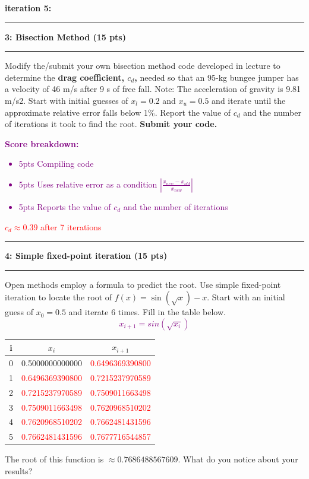 \documentclass[11pt]{article}
\newcommand\question[2]{\vspace{.25in}\hrule\textbf{#1: #2}\vspace{.5em}\hrule\vspace{.10in}}
\begin{document}
\textbf{iteration 5:}\\

\question{3}{Bisection Method (15 pts)}
Modify the/submit your own bisection method code developed in lecture to determine the \textbf{drag coefficient, $c_d$,} needed so that an 95-kg bungee jumper has a velocity of 46 m/s after
9 s of free fall. Note: The acceleration of gravity is 9.81 m/s2.
Start with initial guesses of $x_l = 0.2$ and $x_u = 0.5$ and iterate
until the approximate relative error falls below 1\%. Report the value of $c_d$ and the number of iterations it took to find the root. \textbf{Submit your code.}
\\
\vspace{4pt}
\textcolor{purple}{\textbf{Score breakdown:}
	\begin{itemize}
		\item 5pts Compiling code
		\item 5pts Uses relative error as a condition $|\frac{x_{new}-x_{old}}{x_{new}}|$
		\item 5pts Reports the value of $c_d$ and the number of iterations
\end{itemize}}
\textcolor{red}{$c_d \approx 0.39$ after 7 iterations}

\newpage
\question{4}{Simple fixed-point iteration (15 pts)}
Open methods employ a formula to predict the root. Use simple fixed-point iteration to locate the root of $f(x)=\sin(\sqrt{x})-x$. Start with an initial guess of $x_0=0.5$ and iterate 6 times. Fill in the table below. \\
\textcolor{purple}{$$x_{i+1}=sin(\sqrt{x_i})$$}
\begin{table}[H]
	\centering
	\begin{tabular}{c | c | c}
		i & $x_i$ & $x_{i+1}$ \\
		\hline
		0 & 0.5000000000000 & \textcolor{red}{0.6496369390800}\\ 
		\hline
		1 & \textcolor{red}{0.6496369390800} & \textcolor{red}{0.7215237970589}\\
		\hline
		2 &	\textcolor{red}{0.7215237970589} & \textcolor{red}{0.7509011663498}\\ 
		\hline
		3 &\textcolor{red}{0.7509011663498}  & \textcolor{red}{0.7620968510202}\\
		\hline
		4 &\textcolor{red}{0.7620968510202}  & \textcolor{red}{0.7662481431596}\\
 		\hline
 		5 &\textcolor{red}{0.7662481431596}  & \textcolor{red}{0.7677716544857}\\
	\end{tabular}
\end{table}
The root of this function is $\approx 0.7686488567609$. What do you notice about your results?\\
\end{document}
